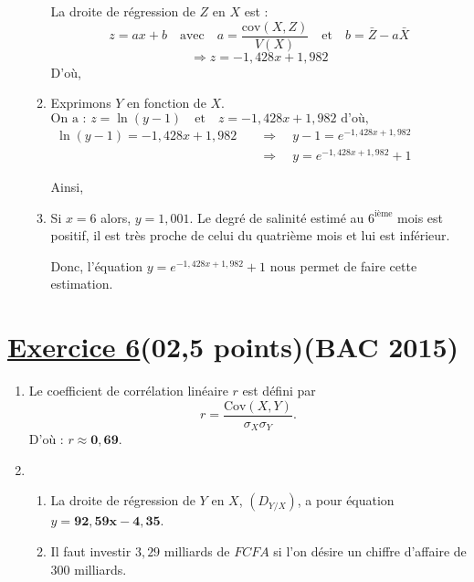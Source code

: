 \documentclass[12pt,a4paper]{article}
\begin{document}
\begin{enumerate}
\begin{enumerate}
        La droite de régression de \( Z \) en \( X \) est :
        \[
        z = ax + b \quad \text{avec} \quad a = \frac{\text{cov}(X, Z)}{V(X)} 
        \quad \text{et} \quad 
        b = \bar{Z} - a\bar{X}
        \]
        \[
        \Rightarrow z = -1{,}428x + 1{,}982
        \]
        D'où, 

        \item Exprimons \( Y \) en fonction de \( X \).
        \( \text{On a : } z = \ln(y - 1) \quad \text{et} \quad z = -1{,}428x + 1{,}982 \text{ d'où,}\)
\(
\begin{aligned}
\ln(y - 1) = -1{,}428x + 1{,}982 &\quad \Rightarrow \quad y - 1 = e^{-1{,}428x + 1{,}982} \\
                                 &\quad \Rightarrow \quad y = e^{-1{,}428x + 1{,}982} + 1
\end{aligned}
\)

Ainsi, 
    \item Si \( x = 6 \) alors, \( y = 1{,}001 \). Le degré de salinité estimé au \( 6^{\text{ième}} \) mois est positif, il est très proche de celui du quatrième mois et lui est inférieur.
    
    Donc, l'équation \( y = e^{-1{,}428x + 1{,}982} + 1 \) nous permet de faire cette estimation.

    \end{enumerate}
\end{enumerate}
\section*{\underline{Exercice 6}(02,5 points)(BAC 2015)}
\begin{enumerate}
    \item Le coefficient de corrélation linéaire \( r \) est défini par 
    \[
    r = \frac{\text{Cov}(X, Y)}{\sigma_X \sigma_Y}.
    \]
    D'où : \( r \approx \mathbf{0{,}69} \).

    \item 
    \begin{enumerate}

            \item La droite de régression de \( Y \) en \( X \), \( (D_{Y/X}) \), a pour équation \( y = \mathbf{92{,}59x - 4{,}35} \).

            \item Il faut investir \( 3{,}29 \) milliards de \( \mathit{FCFA} \) si l'on désire un chiffre d'affaire de 300 milliards.

    \end{enumerate}
\end{enumerate}
\end{document}
